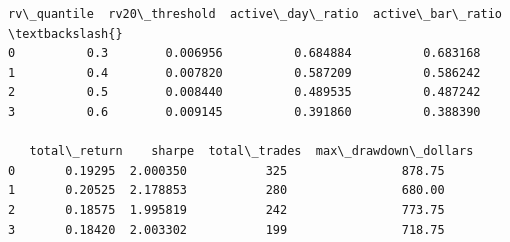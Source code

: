 \documentclass[11pt]{article}
\makeatletter
\newcommand{\boxspacing}{\kern\kvtcb@left@rule\kern\kvtcb@boxsep}
\newcommand{\prompt}[4]{
        {\ttfamily\llap{{\color{#2}[#3]:\hspace{3pt}#4}}\vspace{-\baselineskip}}
    }
\makeatother
\begin{document}
            \begin{tcolorbox}[breakable, size=fbox, boxrule=.5pt, pad at break*=1mm, opacityfill=0]
\prompt{Out}{outcolor}{17}{\boxspacing}
\begin{Verbatim}[commandchars=\\\{\}]
   rv\_quantile  rv20\_threshold  active\_day\_ratio  active\_bar\_ratio  \textbackslash{}
0          0.3        0.006956          0.684884          0.683168
1          0.4        0.007820          0.587209          0.586242
2          0.5        0.008440          0.489535          0.487242
3          0.6        0.009145          0.391860          0.388390

   total\_return    sharpe  total\_trades  max\_drawdown\_dollars
0       0.19295  2.000350           325                878.75
1       0.20525  2.178853           280                680.00
2       0.18575  1.995819           242                773.75
3       0.18420  2.003302           199                718.75
\end{Verbatim}
\end{tcolorbox}
        
\end{document}
